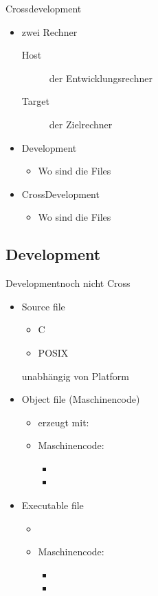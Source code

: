 \begin{frame}{Crossdevelopment}
 \begin{itemize}
  \item zwei Rechner
  \begin{description}
   \item[Host] der Entwicklungsrechner
   \item[Target] \targetS der Zielrechner
  \end{description}
  \item Development
  \begin{itemize}
   \item Wo sind die Files
  \end{itemize}
  \item CrossDevelopment
  \begin{itemize}
   \item Wo sind die Files
  \end{itemize}
 \end{itemize}
\end{frame}

\subsection{Development}

\begin{frame}{Development}{noch nicht Cross}
 \begin{itemize}
  \item Source file 
  \begin{itemize}
   \item C
   \item POSIX
  \end{itemize}
  unabhängig von Platform
  \item Object file (Maschinencode) 
  \begin{itemize}
   \item erzeugt mit: 
   \item Maschinencode: 
   \begin{itemize}
    \item {} 
    \item {}
   \end{itemize}
  \end{itemize}
  \item Executable file 
  \begin{itemize}
   \item {}
   \item Maschinencode:
   \begin{itemize}
    \item {} 
    \item {}
   \end{itemize}
  \end{itemize}
 \end{itemize}
\end{frame}

